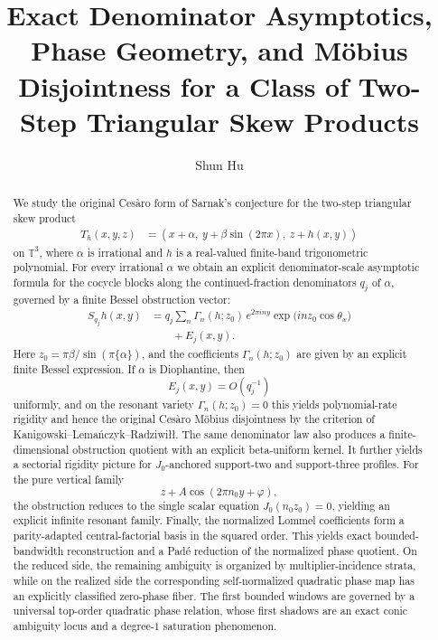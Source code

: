 \documentclass[11pt,reqno]{amsart}
\title[Exact Denominator Asymptotics and Phase Geometry]{Exact Denominator Asymptotics, Phase Geometry, and M\"obius Disjointness for a Class of Two-Step Triangular Skew Products}
\author[Shun Hu]{Shun Hu}
\date{}
\theoremstyle{definition}
\newcommand{\T}{\mathbb{T}}
\newcommand{\e}[1]{e^{2\pi i #1}}
\newcommand{\qj}{q_j}
\begin{document}
\begin{abstract}
We study the original Ces\`aro form of Sarnak's conjecture for the two-step triangular skew
product
\[
\begin{aligned}
T_h(x,y,z)
&=(x+\alpha,\ y+\beta\sin(2\pi x),\ z+h(x,y))
\end{aligned}
\]
on $\T^3$, where $\alpha$ is irrational and $h$ is a real-valued finite-band trigonometric
polynomial. For every irrational $\alpha$ we obtain an explicit denominator-scale asymptotic
formula for the cocycle blocks along the continued-fraction denominators $\qj$ of $\alpha$,
governed by a finite Bessel obstruction vector:
\[
\begin{aligned}
S_{\qj}h(x,y)
&=
\qj \sum_n \Gamma_n(h;z_0)\,\e{ny}\exp\!\bigl(i n z_0 \cos \theta_x\bigr)\\
&\qquad +E_j(x,y).
\end{aligned}
\]
Here $z_0=\pi\beta/\sin(\pi\{\alpha\})$, and the coefficients $\Gamma_n(h;z_0)$ are given by an
explicit finite Bessel expression. If $\alpha$ is Diophantine, then
\[
E_j(x,y)=O(\qj^{-1})
\]
uniformly, and on the resonant variety $\Gamma_n(h;z_0)=0$ this yields polynomial-rate rigidity
and hence the original Ces\`aro M\"obius disjointness by the criterion of
Kanigowski--Lema\'nczyk--Radziwi\l\l. The same denominator law also produces a finite-dimensional
obstruction quotient with an explicit beta-uniform kernel. It further yields a sectorial
rigidity picture for $J_0$-anchored support-two and support-three profiles. For the pure
vertical family
\[
z+A\cos(2\pi n_0 y+\varphi),
\]
the obstruction reduces to the single scalar equation $J_0(n_0 z_0)=0$, yielding an explicit
infinite resonant family. Finally, the normalized Lommel coefficients form a parity-adapted
central-factorial basis in the squared order. This yields exact bounded-bandwidth
reconstruction and a Pad\'e reduction of the normalized phase quotient. On the reduced side,
the remaining ambiguity is organized by multiplier-incidence strata, while on the realized side
the corresponding self-normalized quadratic phase map has an explicitly classified zero-phase
fiber. The first bounded windows are governed by a universal top-order quadratic phase relation,
whose first shadows are an exact conic ambiguity locus and a degree-$1$ saturation phenomenon.
\end{abstract}

\maketitle
\end{document}
